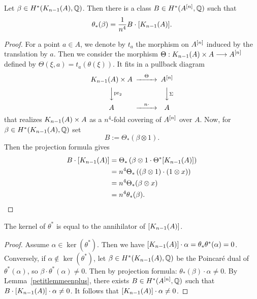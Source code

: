 \begin{lemma}\label{petitlemmeenplus}
 Let $\beta\in H^*(K_{n-1}(A),\Q)$. Then there is a class $B\in H^{*}(A\hilb{n},\Q)$ such that 
 $$\theta_*(\beta)=\frac{1}{n^4}B\cdot [\kum{A}{n-1}].$$
\end{lemma}
\begin{proof}
For a point $a\in A$, we denote by $t_a$ the morphism on $A\hilb{n}$ induced by the translation by $a$.
Then we consider the morphism $\Theta :\kum{A}{n-1}\times A \longrightarrow A\hilb{n}$ defined by $\Theta(\xi,a)=t_a(\theta(\xi))$. It fits in a pullback diagram
\begin{equation}
\begin{CD}
\kum{A}{n-1}\times A @>\Theta >> A\hilb{n}\\
@VV\pr_2V @VV\Sigma V\\
A @> n\cdot >> A
\end{CD}
\end{equation}
that realizes $\kum{A}{n-1}\times A$ as a $n^4$-fold covering of $A\hilb{n}$ over $A$.
Now, for $\beta\in H^*(K_{n-1}(A),\Q)$ set
$$
B:=\Theta_*(\beta\otimes 1).
$$
Then the projection formula gives
\begin{align*}
B\cdot [K_{n-1}(A)]&= \Theta_*\left(\beta\otimes 1\cdot \Theta^*[\kum{A}{n-1}]\right) \\
&=n^4 \Theta_*\left((\beta\otimes 1)\cdot  (1\otimes x)\right)\\
&=n^4 \Theta_*(\beta \otimes x)\\
&=n^4\theta_*(\beta).
\end{align*}

\end{proof}

\begin{proposition}\label{annihilator}
The kernel of $\theta^*$ is equal to the annihilator of $[\kum{A}{n-1}]$.
\end{proposition}
\begin{proof}
Assume $\alpha\in \ker(\theta^*)$. Then we have
$
[\kum{A}{n-1}]\cdot \alpha = \theta_*\theta^*(\alpha) = 0
$. 
Conversely, if $\alpha\notin \ker(\theta^*)$,
let $\beta\in H^*(\kum{A}{n-1},\Q)$ be the Poincar\'e dual of $\theta^*(\alpha)$, so $\beta\cdot \theta^*(\alpha)\neq 0$.
Then by projection formula:
$
\theta_*(\beta)\cdot \alpha\neq 0.
$
By Lemma~\ref{petitlemmeenplus}, there exists $B\in H^*(A\hilb{n},\Q)$ such that 
$B\cdot [\kum{A}{n-1}]\cdot \alpha\neq 0$. It follows that $ [\kum{A}{n-1}]\cdot \alpha\neq 0$.
\end{proof}


